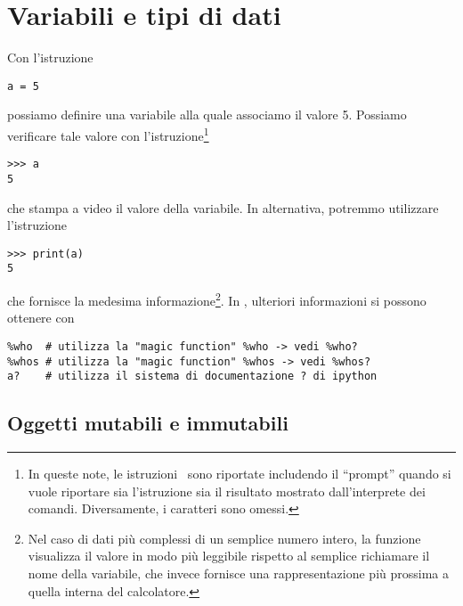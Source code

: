 \chapter{Variabili e tipi di dati}
\label{variabili-tipi-dati}

Con l'istruzione
\begin{verbatim}
a = 5
\end{verbatim}
possiamo definire una variabile  alla quale associamo il valore 5.
Possiamo verificare tale valore con l'istruzione\footnote{In queste note, le
istruzioni \python\ sono riportate includendo il ``prompt'' \istr{>>>} quando
si vuole riportare sia l'istruzione sia il risultato mostrato dall'interprete
dei comandi. Diversamente, i caratteri \istr{>>>} sono omessi.}
\begin{verbatim}
>>> a
5
\end{verbatim}
che stampa a video il valore della variabile. In alternativa, potremmo
utilizzare l'istruzione
\begin{verbatim}
>>> print(a)
5
\end{verbatim}
che fornisce la medesima informazione\footnote{Nel caso di dati pi\`u complessi
di un semplice numero intero, la funzione  visualizza il valore
in modo pi\`u leggibile rispetto al semplice richiamare il nome della
variabile, che invece fornisce una rappresentazione pi\`u prossima a quella
interna del calcolatore.}. In \ipython, ulteriori informazioni si possono
ottenere con 
\begin{verbatim}
%who  # utilizza la "magic function" %who -> vedi %who?
%whos # utilizza la "magic function" %whos -> vedi %whos?
a?    # utilizza il sistema di documentazione ? di ipython
\end{verbatim}

\section{Oggetti mutabili e immutabili}
\label{sect:mutabili-immutabili}


